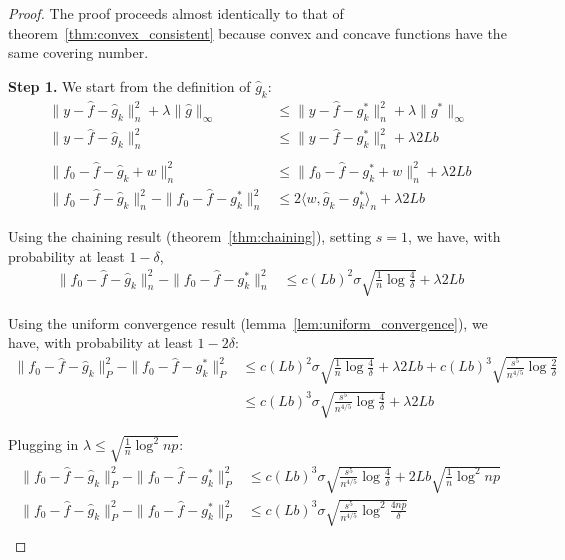\begin{proof}
The proof proceeds almost identically to that of theorem~\ref{thm:convex_consistent} because convex and concave functions have the same covering number.

\textbf{Step 1.} We start from the definition of $\hat{g}_k$:
\begin{align*}
\| y - \hat{f} - \hat{g}_k \|_n^2 + \lambda \| \hat{g} \|_\infty &\leq
   \| y - \hat{f} - g^*_k \|_n^2 + \lambda \| g^* \|_\infty \\
\| y - \hat{f} - \hat{g}_k \|_n^2 &\leq \| y - \hat{f} - g^*_k \|_n^2 + \lambda 2 Lb \\
 &\\
\| f_0 - \hat{f} - \hat{g}_k + w\|_n^2 & \leq \| f_0 - \hat{f} - g^*_k + w \|_n^2 
   +\lambda 2 Lb \\
\| f_0 - \hat{f} - \hat{g}_k \|_n^2 - \|f_0 -\hat{f} - g^*_k\|_n^2 &\leq
   2 \langle w, \hat{g}_k - g^*_k \rangle_n + \lambda 2Lb
\end{align*}

Using the chaining result (theorem~\ref{thm:chaining}), setting $s=1$, we have, with probability at least $1-\delta$,
\begin{align*}
\| f_0 - \hat{f} - \hat{g}_k \|_n^2 - \|f_0 - \hat{f} - g^*_k \|_n^2 &\leq
  c (Lb)^2 \sigma \sqrt{ \frac{1}{n} \log \frac{4}{\delta} }+ \lambda 2 Lb
\end{align*}

Using the uniform convergence result (lemma~\ref{lem:uniform_convergence}), we have, with probability at least $1-2\delta$:
\begin{align*}
\| f_0 - \hat{f} - \hat{g}_k \|_P^2 - \|f_0 - \hat{f} - g^*_k \|_P^2 &\leq
  c (Lb)^2 \sigma \sqrt{ \frac{1}{n} \log \frac{4}{\delta} }+ \lambda 2 Lb +
  c (Lb)^3 \sqrt{\frac{s^5}{n^{4/5}} \log \frac{2}{\delta} } \\
 &\leq c (Lb)^3\sigma \sqrt{\frac{s^5}{n^{4/5}} \log \frac{4}{\delta}}+ \lambda 2 Lb
\end{align*}

Plugging in $\lambda \leq \sqrt{ \frac{1}{n} \log^2 np}$:
\begin{align*}
\| f_0 - \hat{f} - \hat{g}_k \|_P^2 - \|f_0 - \hat{f} - g^*_k \|_P^2 &
\leq c (Lb)^3\sigma \sqrt{\frac{s^5}{n^{4/5}} \log \frac{4}{\delta}}+ 
    2Lb \sqrt{\frac{1}{n} \log^2 np}\\
\| f_0 - \hat{f} - \hat{g}_k \|_P^2 - \|f_0 - \hat{f} - g^*_k \|_P^2 &
\leq c (Lb)^3\sigma \sqrt{\frac{s^5}{n^{4/5}} \log^2 \frac{4np}{\delta}} \\
\end{align*}


\end{proof}
